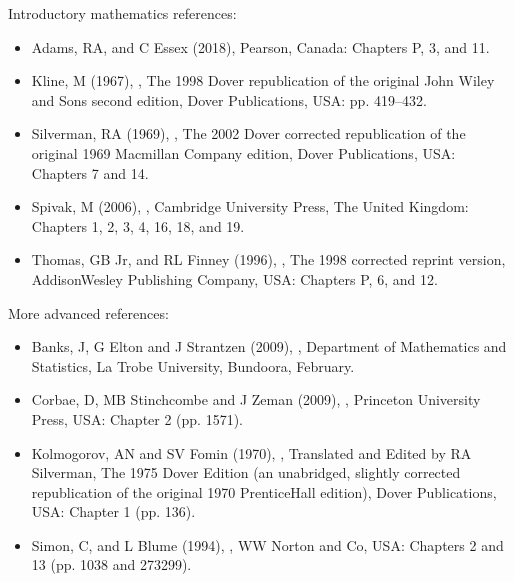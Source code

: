 \documentclass[letterpaper,10pt,english]{jupyterBook}
\begin{document}
\sphinxAtStartPar
Introductory mathematics references:
\begin{itemize}
\item {} 
\sphinxAtStartPar
Adams, RA, and C Essex (2018),  Pearson, Canada: Chapters P, 3, and 11.

\item {} 
\sphinxAtStartPar
Kline, M (1967), , The 1998 Dover republication of the original John Wiley and Sons second edition, Dover Publications, USA: pp. 419–432.

\item {} 
\sphinxAtStartPar
Silverman, RA (1969), , The 2002 Dover corrected republication of the original 1969 Macmillan Company edition, Dover Publications, USA: Chapters 7 and 14.

\item {} 
\sphinxAtStartPar
Spivak, M (2006), , Cambridge University Press, The United Kingdom: Chapters 1, 2, 3, 4, 16, 18, and 19.

\item {} 
\sphinxAtStartPar
Thomas, GB Jr, and RL Finney (1996), , The 1998 corrected reprint version, Addison\sphinxhyphen{}Wesley Publishing Company, USA: Chapters P, 6, and 12.

\end{itemize}

\sphinxAtStartPar
More advanced references:
\begin{itemize}
\item {} 
\sphinxAtStartPar
Banks, J, G Elton and J Strantzen (2009), , Department of Mathematics and Statistics, La Trobe University, Bundoora, February.

\item {} 
\sphinxAtStartPar
Corbae, D, MB Stinchcombe and J Zeman (2009), , Princeton University Press, USA: Chapter 2 (pp. 15\sphinxhyphen{}71).

\item {} 
\sphinxAtStartPar
Kolmogorov, AN and SV Fomin (1970), , Translated and Edited by RA Silverman, The 1975 Dover Edition (an unabridged, slightly corrected republication of the original 1970 Prentice\sphinxhyphen{}Hall edition), Dover Publications, USA: Chapter 1 (pp. 1\sphinxhyphen{}36).

\item {} 
\sphinxAtStartPar
Simon, C, and L Blume (1994), , WW Norton and Co, USA: Chapters 2 and 13 (pp. 10\sphinxhyphen{}38 and 273\sphinxhyphen{}299).

\end{itemize}
\end{document}
